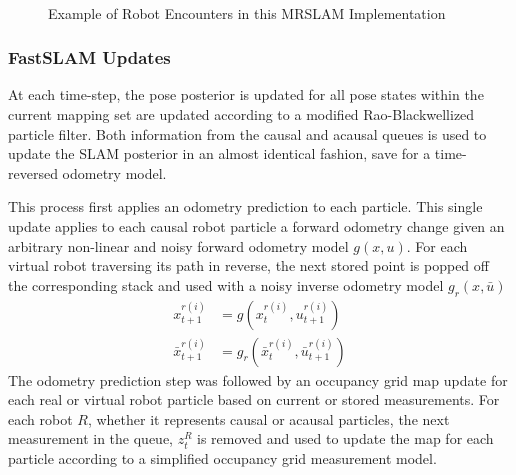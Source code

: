 \begin{figure}[ht!]
     \\
\caption{Example of Robot Encounters in this MRSLAM Implementation}
\label{fig:multiencounter}
\end{figure}

\vspace{0.1in}
\subsubsection{FastSLAM Updates}
At each time-step, the pose posterior is updated for all pose states within the current mapping set are updated according to a modified Rao-Blackwellized particle filter. Both information from the causal and acausal queues is used to update the SLAM posterior in an almost identical fashion, save for a time-reversed odometry model. 

This process first applies an odometry prediction to each particle. This single update applies to each causal robot particle a forward odometry change given an arbitrary non-linear and noisy forward odometry model $g(x,u)$. For each virtual robot traversing its path in reverse, the next stored point is popped off the corresponding stack and used with a noisy inverse odometry model $g_r(x,\bar{u})$
\begin{align*}
x_{t+1}^{r(i)} &= g(x_{t}^{r(i)},u_{t+1}^{r(i)})\\
\bar{x}_{t+1}^{r(i)} &= g_r(\bar{x}_t^{r(i)}, \bar{u}_{t+1}^{r(i)})
\end{align*}
The odometry prediction step was followed by an occupancy grid map update for each real or virtual robot particle based on current or stored measurements. For each robot $R$, whether it represents causal or acausal particles, the next measurement in the queue, $z_t^R$ is removed and used to update the map for each particle according to a simplified occupancy grid measurement model.

